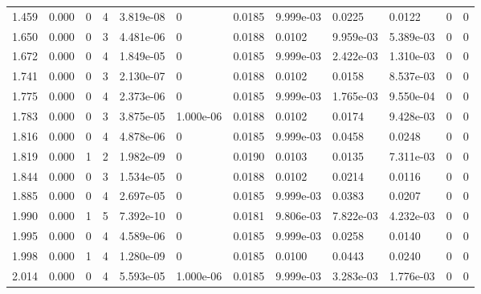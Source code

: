 \documentclass[preview]{standalone}
\begin{document}
{{\begin{tabular}{L{1.2cm}C{1.2cm} C{0.3cm}C{0.5cm} C{1.4cm}C{1.4cm} C{1.4cm}C{1.4cm} C{1.6cm}C{1.6cm} C{1.6cm}C{1.6cm}}
  1.459  &  0.000  & 0     &  4 &  3.819e-08  & 0  &  0.0185&   9.999e-03& 0.0225 & 0.0122   &  0 & 0  \\ 
  1.650  &  0.000  & 0     &  3 &  4.481e-06  & 0  &  0.0188&   0.0102& 9.959e-03 & 5.389e-03   &  0 & 0  \\ 
  1.672  &  0.000  & 0     &  4 &  1.849e-05  & 0  &  0.0185&   9.999e-03& 2.422e-03 & 1.310e-03   &  0 & 0  \\ 
  1.741  &  0.000  & 0     &  3 &  2.130e-07  & 0  &  0.0188&   0.0102& 0.0158 & 8.537e-03   &  0 & 0  \\ 
  1.775  &  0.000  & 0     &  4 &  2.373e-06  & 0  &  0.0185&   9.999e-03& 1.765e-03 & 9.550e-04   &  0 & 0  \\ 
  1.783  &  0.000  & 0     &  3 &  3.875e-05  & 1.000e-06  &  0.0188&   0.0102& 0.0174 & 9.428e-03   &  0 & 0  \\ 
  1.816  &  0.000  & 0     &  4 &  4.878e-06  & 0  &  0.0185&   9.999e-03& 0.0458 & 0.0248   &  0 & 0  \\ 
  1.819  &  0.000  & 1     &  2 &  1.982e-09  & 0  &  0.0190&   0.0103& 0.0135 & 7.311e-03   &  0 & 0  \\ 
  1.844  &  0.000  & 0     &  3 &  1.534e-05  & 0  &  0.0188&   0.0102& 0.0214 & 0.0116   &  0 & 0  \\ 
  1.885  &  0.000  & 0     &  4 &  2.697e-05  & 0  &  0.0185&   9.999e-03& 0.0383 & 0.0207   &  0 & 0  \\ 
  1.990  &  0.000  & 1     &  5 &  7.392e-10  & 0  &  0.0181&   9.806e-03& 7.822e-03 & 4.232e-03   &  0 & 0  \\ 
  1.995  &  0.000  & 0     &  4 &  4.589e-06  & 0  &  0.0185&   9.999e-03& 0.0258 & 0.0140   &  0 & 0  \\ 
  1.998  &  0.000  & 1     &  4 &  1.280e-09  & 0  &  0.0185&   0.0100& 0.0443 & 0.0240   &  0 & 0  \\ 
  2.014  &  0.000  & 0     &  4 &  5.593e-05  & 1.000e-06  &  0.0185&   9.999e-03& 3.283e-03 & 1.776e-03   &  0 & 0  \\ 
\hline 
\end{tabular} 

}}
\end{document}
